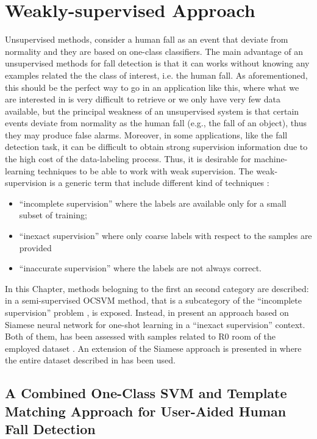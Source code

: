 \chapter{Weakly-supervised Approach}
\label{ch:weakley_supervised}
Unsupervised methods, consider a human fall as an event that deviate from normality and they are based on one-class classifiers. The main advantage of an unsupervised methods for fall detection is that it can works without knowing any examples related the the class of interest, i.e. the human fall. As aforementioned, this should be the perfect way to go in an application like this, where what we are interested in is very difficult to retrieve or we only have very few data available, but the principal weakness of an unsupervised system is that certain events deviate from normality as the human fall (e.g., the fall of an object), thus they may produce false alarms.
Moreover, in some applications, like the fall detection task, it can be difficult to obtain
strong supervision information due to the high cost of the data-labeling process. Thus, it is desirable for machine-learning techniques to be able to work with weak supervision.
The weak-supervision is a generic term that include different kind of techniques \cite{zhou2017brief}:
\begin{itemize}
	\item ``incomplete supervision'' where the labels are available only for a small subset of training;	
	\item ``inexact supervision'' where only coarse labels with respect to the samples are provided
	\item ``inaccurate supervision'' where the labels are not always correct.
\end{itemize}

In this Chapter, methods belogning to the first an second category are described: in  a semi-supervised OCSVM method, that is a subcategory of the ``incomplete supervision'' problem \cite{zhou2017brief}, is exposed. Instead, in  present an approach based on Siamese neural network for one-shot learning in a ``inexact supervision'' context. Both of them, has been assessed with samples related to R0 room of the employed dataset . An extension of the Siamese approach is presented in  where the entire dataset described in  has been used.




\section{A Combined One-Class SVM and Template Matching Approach for User-Aided Human Fall Detection}
\label{sec:user_aided_cin}

